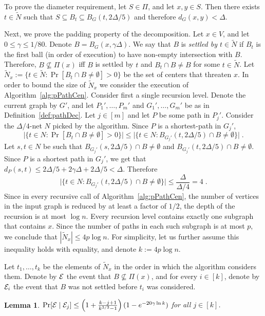 \documentclass[11pt,fleqn]{article}
\newtheorem{lemma}[theorem]{Lemma}
\providecommand{\eqdef}{:=}
\begin{document}
To prove the diameter requirement, let $S \in \Pi$, and let $x,y \in S$. Then there exists $t \in \tilde{N}$ such that $S \subseteq B_t \subseteq B_G(t,2\Delta/5)$ and therefore $d_G(x,y) < \Delta$.

Next, we prove the padding property of the decomposition. 
Let $x \in V$, and let $0 \le \gamma \le 1/80$. Denote $B = B_G(x,\gamma \Delta)$.
We say that $B$ is {\em settled by $t \in \tilde{N}$} if $B_t$ is the first ball (in order of execution) to have non-empty intersection with $B$. Therefore, $B \not\subseteq \Pi(x)$ iff $B$ is settled by $t$ and $B_t \cap B \ne B$ for some $t \in \tilde{N}$.
Let $\tilde{N}_x \eqdef \{ t \in \tilde{N} : \Pr[B_t \cap B \ne \emptyset] > 0 \}$ be the set of centers that threaten $x$. In order to bound the size of $\tilde{N}_x$ we consider the execution of Algorithm~\ref{alg:pPathCen}.
Consider first a single recursion level. Denote the current graph by $G'$, and let $P_1',\ldots,P_m'$ and $G_1',\ldots,G_m'$ be as in Definition~\ref{def:pathDec}. Let $j \in [m]$ and let $P$ be some path in $P_j'$.  Consider the $\Delta/4$-net $N$ picked by the algorithm. Since $P$ is a shortest-path in $G_j'$, 
$$\big|\{ t \in N : \Pr[ B_t \cap B \ne \emptyset] > 0 \}\big| \le \big|\{t \in N : B_{G_j'}(t,2\Delta/5) \cap B \ne \emptyset \}\big| \;.$$
Let $s,t \in N$ be such that $B_{G_j'}(s,2\Delta/5) \cap B \ne \emptyset$ and $B_{G_j'}(t,2\Delta/5) \cap B \ne \emptyset$. Since $P$ is a shortest path in $G_j'$, we get that $d_{P}(s,t) \le 2\Delta/5 + 2 \gamma \Delta + 2\Delta/5 < \Delta$. Therefore 
$$\big|\{t \in N : B_{G_j'}(t,2\Delta/5) \cap B \ne \emptyset \}\big| \le \frac{\Delta}{\Delta/4} = 4 \;.$$
Since in every recursive call of Algorithm~\ref{alg:pPathCen}, the number of vertices in the input graph is reduced by at least a factor of $1/2$, the depth of the recursion is at most $\log n$.
Every recursion level contains exactly one subgraph that contains $x$. Since the number of paths in each such subgraph is at most $p$, we conclude that $|\tilde{N}_x| \le 4 p \log n$. For simplicity, let us further assume this inequality holds with equality, and denote $k \eqdef 4 p \log n$.

Let $t_1,\ldots,t_k$ be the elements of $\tilde{N}_x$ in the order in which the algorithm considers them.
Denote by ${\cal E}$ the event that $B \not\subseteq \Pi(x)$, and for every $i \in [k]$, denote by ${\cal E}_i$ the event that $B$ was not settled before $t_i$ was considered.
\begin{lemma} \label{l:ind}
$\Pr[{\cal E} \mid {\cal E}_j] \le \left( 1 + \frac{k-j+1}{k^{3/2} - 1} \right)(1-e^{- 20 \gamma \ln k})$ for all $j \in [k]$.
\end{lemma}
\end{document}
